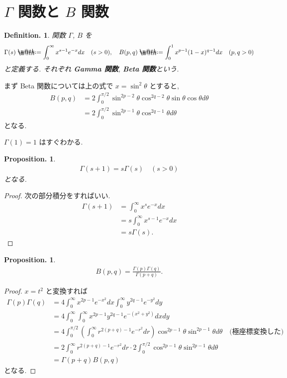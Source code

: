 \documentclass[openany, a4paper, oneside]{jsbook}
\makeatletter
\newcommand*{\defeq}{\mathrel{\rlap{%
\raisebox{0.3ex}{$\m@th\cdot$}}%
\raisebox{-0.3ex}{$\m@th\cdot$}}%
=}
\theoremstyle{break}
\theoremstyle{breakdefn}
\newtheorem{prop}[thm]{Proposition.}
\newtheorem{defn}[thm]{Definition.}
\makeatother
\begin{document}
\section{$\Gamma$ 関数と $B$ 関数}


\begin{defn}
関数 $\Gamma$, $B$ を
\begin{align}
 \Gamma (s)
 \defeq
 \int_0^{\infty} x^{s-1} e^{-x} dx \quad (s > 0 ),
 \quad
 B(p, q)
 \defeq
 \int_0^1 x^{p-1}(1-x)^{q-1} dx \quad (p, q > 0)
\end{align}
と定義する.
それぞれ \textbf{Gamma 関数}, \textbf{Beta 関数}という.
\end{defn}
まず Beta 関数については上の式で $x = \sin^2 \theta$ とすると,
\begin{align}
 B(p, q)
 &=
 2 \int_0^{\pi/2} \sin^{2p-2} \theta \cos^{2q-2} \theta \sin \theta \cos \theta d \theta \\
 &=
 2\int_0^{\pi/2} \sin^{2p-1} \theta \cos^{2q-1}\theta d\theta
\end{align}
となる.

$\Gamma(1) = 1$ はすぐわかる.
\begin{prop}
\begin{align}
 \Gamma(s+1)
 =
 s \Gamma (s) \quad (s>0)
\end{align}
となる.
\end{prop}
\begin{proof}
次の部分積分をすればいい.
\begin{align}
 \Gamma(s + 1)
 &=
 \int_0^{\infty} x^s e^{-x} dx \\
 &=
 s \int_0^{\infty} x^{s-1} e^{-x} dx \\
 &=
 s\Gamma(s).
\end{align}
\end{proof}

\begin{prop}
\begin{align}
 B(p, q)
 =
 \frac{\Gamma(p) \Gamma(q)}{\Gamma(p+q)}.
\end{align}
\end{prop}
\begin{proof}
$x = t^2$ と変換すれば
\begin{align}
 \Gamma(p) \Gamma(q)
 &=
 4 \int_0^{\infty}x^{2p-1} e^{-x^2}dx \int_0^{\infty}y^{2q-1} e^{-y^2} dy \\
 &=
 4 \int_0^{\infty} \int_0^{\infty} x^{2p-1} y^{2q-1} e^{-(x^2+y^2)} dxdy \\
 &=
 4 \int_0^{\pi/2} \left( \int_0^{\infty} r^{2(p+q)-1} e^{-r^2} dr \right)
  \cos^{2p-1}\theta \sin^{2p-1}\theta d\theta
  \quad \text{(極座標変換した)} \\
 &=
 2\int_0^{\infty} r^{2(p+q)-1} e^{-r^2} dr
  \cdot 2\int_0^{\pi/2} \cos^{2p-1}\theta \sin^{2p-1}\theta d\theta  \\
 &=
 \Gamma(p+q)B(p, q)
\end{align}
となる.
\end{proof}
\end{document}
